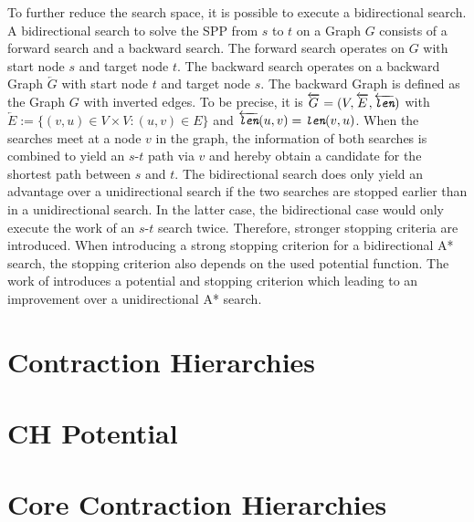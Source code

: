 To further reduce the search space, it is possible to execute a bidirectional search. A bidirectional search to solve the SPP from $s$ to $t$ on a Graph $G$ consists of a forward search and a backward search. The forward search operates on $G$ with start node $s$ and target node $t$. The backward search operates on a backward Graph $\overleftarrow{G}$ with start node $t$ and target node $s$. The backward Graph is defined as the Graph $G$ with inverted edges. To be precise, it is $\overleftarrow{G} = (V,\overleftarrow{E},\overleftarrow{\texttt{\itshape len}})$ with $\overleftarrow{E} := \{(v,u) \in V \times V : (u,v) \in E\}$ and $\overleftarrow{\texttt{\itshape len}}(u,v) = \texttt{\itshape len}(v,u)$. When the searches meet at a node $v$ in the graph, the information of both searches is combined to yield an $s$-$t$ path via $v$ and hereby obtain a candidate for the shortest path between $s$ and $t$. The bidirectional search does only yield an advantage over a unidirectional search if the two searches are stopped earlier than in a unidirectional search. In the latter case, the bidirectional case would only execute the work of an $s$-$t$ search twice. Therefore, stronger stopping criteria are introduced. When introducing a strong stopping criterion for a bidirectional A* search, the stopping criterion also depends on the used potential function. The work of \cite{goldberg:2005} introduces a potential and stopping criterion which leading to an improvement over a unidirectional A* search.

\section{Contraction Hierarchies}
\label{sec:ch}
\section{CH Potential\label{sec:ch_pot}}
\section{Core Contraction Hierarchies}